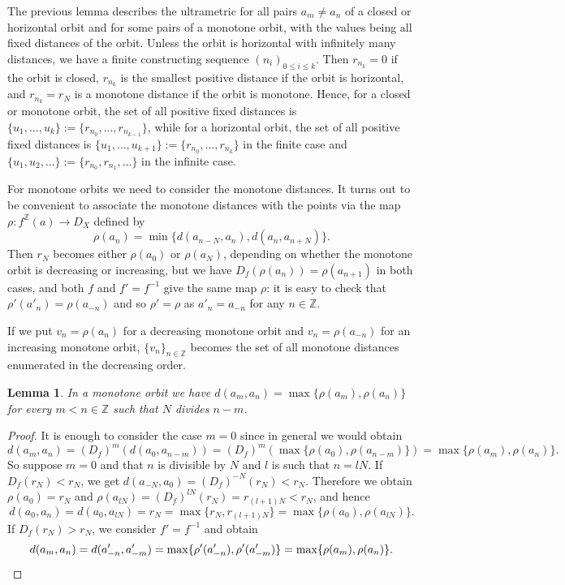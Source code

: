 \documentclass[10pt,a4paper]{article}
\newtheorem{lm}[tw]{Lemma}
\theoremstyle{definition}
\theoremstyle{remark}
\newcommand \set [1]{\{#1\}}
\newcommand \maps {\colon} %
\newcommand \Z {\mathbb{Z}}
\begin{document}
The previous lemma describes the ultrametric for all pairs $a_m \neq a_n$ of a closed or horizontal orbit and for some pairs of a monotone orbit, with the values being all fixed distances of the orbit.
Unless the orbit is horizontal with infinitely many distances, we have a finite constructing sequence $(n_i)_{0 \leq i \leq k}$.
Then $r_{n_k} = 0$ if the orbit is closed, $r_{n_k}$ is the smallest positive distance if the orbit is horizontal, and $r_{n_k} = r_N$ is a monotone distance if the orbit is monotone.
Hence, for a closed or monotone orbit, the set of all positive fixed distances is $\set{u_1, \ldots, u_k} := \set{r_{n_0}, \ldots, r_{n_{k - 1}}}$, while for a horizontal orbit, the set of all positive fixed distances is $\set{u_1, \ldots, u_{k + 1}} := \set{r_{n_0}, \ldots, r_{n_k}}$ in the finite case and $\set{u_1, u_2, \ldots} := \set{r_{n_0}, r_{n_1}, \ldots}$ in the infinite case.

For monotone orbits we need to consider the monotone distances.
It turns out to be convenient to associate the monotone distances with the points via the map $\rho\maps f^\Z(a) \to D_X$ defined by
\[
    \rho(a_n) = \min\set{d(a_{n - N}, a_n), d(a_n, a_{n + N})}.
\]
Then $r_N$ becomes either $\rho(a_0)$ or $\rho(a_N)$, depending on whether the monotone orbit is decreasing or increasing, but we have $D_f(\rho(a_n)) = \rho(a_{n + 1})$ in both cases, and both $f$ and $f' = f^{-1}$ give the same map $\rho$: it is easy to check that $\rho'(a'_n) = \rho(a_{-n})$ and so $\rho' = \rho$ as $a'_n = a_{-n}$ for any $n \in \Z$.

If we put $v_n = \rho(a_n)$ for a decreasing monotone orbit and $v_n = \rho(a_{-n})$ for an increasing monotone orbit, $\set{v_n}_{n \in \Z}$ becomes the set of all monotone distances enumerated in the decreasing order.

\begin{lm} \label{thm:monotone_distances}
    In a monotone orbit we have $d(a_m, a_n) = \max\set{\rho(a_m), \rho(a_n)}$ for every $m < n \in \Z$ such that $N$ divides $n - m$.
\end{lm}
\begin{proof}
    It is enough to consider the case $m = 0$ since in general we would obtain 
    \[
        d(a_m, a_n) = (D_f)^m(d(a_0, a_{n - m})) = (D_f)^m(\max\set{\rho(a_0), \rho(a_{n - m})}) = \max\set{\rho(a_m), \rho(a_n)}.
    \]
    So suppose $m = 0$ and that $n$ is divisible by $N$ and $l$ is such that $n=lN$.
    If $D_f(r_N) < r_N$, we get $d(a_{-N},a_0)=(D_f)^{-N}(r_N)<r_N$. Therefore we obtain $\rho(a_0) = r_N$ and $\rho(a_{lN}) = (D_f)^{l N}(r_N) = r_{(l + 1) N} < r_N$, and hence 
    \[
        d(a_0, a_n) = d(a_0, a_{l N}) = r_N = \max\set{r_N, r_{(l + 1) N}} = \max\set{\rho(a_0), \rho(a_{l N})}.
    \]
    If $D_f(r_N) > r_N$, we consider $f' = f^{-1}$ and obtain
    \[
        d(a_m, a_n) = d(a'_{-n}, a'_{-m}) = \max\set{\rho'(a'_{-n}), \rho'(a'_{-m})} = \max\set{\rho(a_m), \rho(a_n)}.
        \qedhere
    \]
\end{proof}
\end{document}
